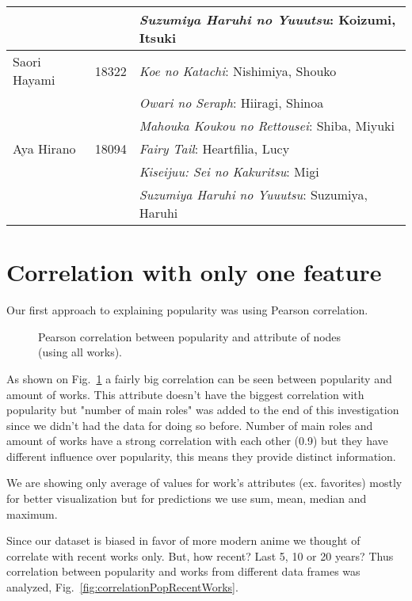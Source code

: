 \begin{table}[!h]
\begin{center}
\begin{tabular}{|l|c|l|}
		 & & \textit{Suzumiya Haruhi no Yuuutsu}: Koizumi, Itsuki \\ 
		\hline
		Saori Hayami & 18322 & \textit{Koe no Katachi}: Nishimiya, Shouko \\ 
		 & & \textit{Owari no Seraph}: Hiiragi, Shinoa \\ 
		 & & \textit{Mahouka Koukou no Rettousei}: Shiba, Miyuki \\
		\hline
		Aya Hirano & 18094 & \textit{Fairy Tail}: Heartfilia, Lucy \\ 
		 & & \textit{Kiseijuu: Sei no Kakuritsu}: Migi \\ 
		 & & \textit{Suzumiya Haruhi no Yuuutsu}: Suzumiya, Haruhi \\
		\hline
	\end{tabular}
	\end{center}
\end{table}

\newpage
\section{Correlation with only one feature}
Our first approach to explaining popularity was using Pearson correlation.

\begin{figure}[!h]
	\begin{flushleft}
	\caption{Pearson correlation between popularity and attribute of nodes (using all works).}
	\label{fig:pearsonCorrAllWorks}
	\end{flushleft}
\end{figure}

As shown on Fig.~\ref{fig:pearsonCorrAllWorks} a fairly big correlation can be seen between popularity and amount of works. This attribute doesn't have the biggest correlation with popularity but "number of main roles" was added to the end of this investigation since we didn't had the data for doing so before. Number of main roles and amount of works have a strong correlation with each other (0.9) but they have different influence over popularity, this means they provide distinct information.

We are showing only average of values for work's attributes (ex. favorites) mostly for better visualization but for predictions we use sum, mean, median and maximum.

Since our dataset is biased in favor of more modern anime we thought of correlate with recent works only. But, how recent? Last 5, 10 or 20 years? Thus correlation between popularity and works from different data frames was analyzed, Fig.~\ref{fig:correlationPopRecentWorks}.

